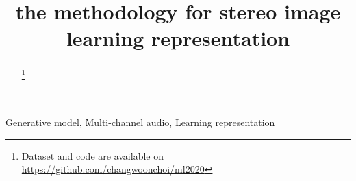 \documentclass{article}
\title{the methodology for stereo image learning representation}
\begin{document}
\maketitle

\begin{abstract}

\footnote{Dataset and code are available on \url{https://github.com/changwoonchoi/ml2020}}
\end{abstract}

\begin{keywords}
Generative model, Multi-channel audio, Learning representation
\end{keywords}









\end{document}
